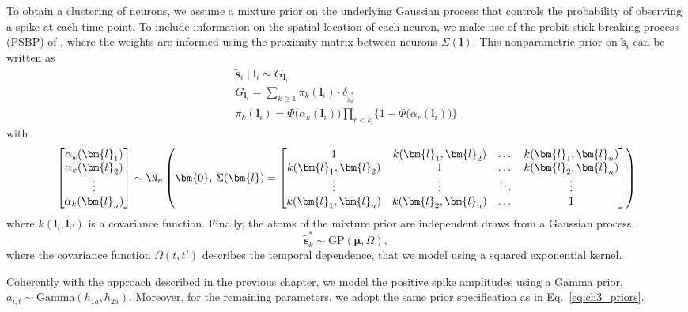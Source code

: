 To obtain a clustering of neurons, we assume a mixture prior on the underlying Gaussian process that controls the probability of observing a spike at each time point. 
To include information on the spatial location of each neuron, we make use of the probit stick-breaking process (PSBP) of \textcite{rodriguez2011}, where the weights are informed using the proximity matrix between neurons $\Sigma(\bm{l})$.
This nonparametric prior on $\tilde{\bm{s}}_i$ can be written as
\begin{equation}
\begin{gathered}
\tilde{\bm{s}}_i\mid \bm{l}_i  \sim G_{\bm{l}_i}\\
G_{\bm{l}_i} = \sum_{k\geq1} \pi_k(\bm{l}_i)\cdot \delta_{\tilde{\bm{s}}^*_k }\\
\pi_k(\bm{l}_i) = \Phi\big(\alpha_k(\bm{l}_i)\big) \prod_{r<k} \big\{ 1- \Phi\big(\alpha_r(\bm{l}_i)\big)\big\}
\end{gathered}
\end{equation}
with 
\begin{equation*}
\begin{bmatrix}
\alpha_k(\bm{l}_1) \\
\alpha_k(\bm{l}_2) \\
\vdots \\
\alpha_k(\bm{l}_n) 
\end{bmatrix} \sim \N_n \left(
\bm{0},\, \Sigma(\bm{l}) = 
\begin{bmatrix}
1 & k(\bm{l}_1,\bm{l}_2) & \dots & k(\bm{l}_1,\bm{l}_n)\\
k(\bm{l}_1,\bm{l}_2) & 1 & \dots & k(\bm{l}_2,\bm{l}_n) \\
\vdots & \vdots & \ddots & \vdots \\
k(\bm{l}_1,\bm{l}_n) & k(\bm{l}_2,\bm{l}_n) & \dots & 1
\end{bmatrix}
\right)
\end{equation*}
where $k(\bm{l}_i,\bm{l}_{i'})$ is a covariance function. Finally, the atoms of the mixture prior are independent draws from a Gaussian process,
\begin{equation*}
\tilde{\bm{s}}^*_k \sim \mathrm{GP}(\bm{\mu},\Omega),
\end{equation*}
where the covariance function $\Omega(t,t')$ describes the temporal dependence, that we model using a squared exponential kernel.

Coherently with the approach described in the previous chapter, we model the positive spike amplitudes using a Gamma prior, $a_{i,t}\sim\mathrm{Gamma}(h_{1a},h_{2a})$. Moreover, for the remaining parameters, we adopt the same prior specification as in Eq.~\eqref{eq:ch3_priors}.


